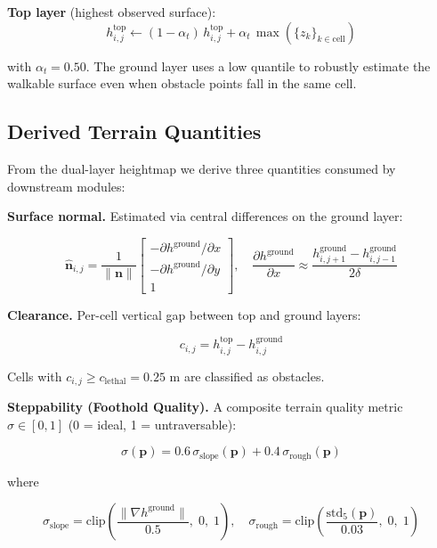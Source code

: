 \documentclass[11pt,a4paper]{article}
\begin{document}
\textbf{Top layer} (highest observed surface):
\begin{equation}
h^{\text{top}}_{i,j} \leftarrow (1 - \alpha_t)\, h^{\text{top}}_{i,j} + \alpha_t\, \max(\{z_k\}_{k \in \text{cell}})
\end{equation}

with $\alpha_t = 0.50$. The ground layer uses a low quantile to robustly estimate the walkable surface even when obstacle points fall in the same cell.

\subsection{Derived Terrain Quantities}

From the dual-layer heightmap we derive three quantities consumed by downstream modules:

\textbf{Surface normal.} Estimated via central differences on the ground layer:

\begin{equation}
\hat{\mathbf{n}}_{i,j} = \frac{1}{\|\mathbf{n}\|}\begin{bmatrix} -\partial h^{\text{ground}} / \partial x \\ -\partial h^{\text{ground}} / \partial y \\ 1 \end{bmatrix}, \quad \frac{\partial h^{\text{ground}}}{\partial x} \approx \frac{h^{\text{ground}}_{i,j+1} - h^{\text{ground}}_{i,j-1}}{2\delta}
\end{equation}

\textbf{Clearance.} Per-cell vertical gap between top and ground layers:

\begin{equation}
c_{i,j} = h^{\text{top}}_{i,j} - h^{\text{ground}}_{i,j}
\end{equation}

Cells with $c_{i,j} \geq c_{\text{lethal}} = 0.25$ m are classified as obstacles.

\textbf{Steppability (Foothold Quality).} A composite terrain quality metric $\sigma \in [0, 1]$ (0 = ideal, 1 = untraversable):

\begin{equation}
\sigma(\mathbf{p}) = 0.6\, \sigma_{\text{slope}}(\mathbf{p}) + 0.4\, \sigma_{\text{rough}}(\mathbf{p})
\end{equation}

where

\begin{equation}
\sigma_{\text{slope}} = \text{clip}\!\left(\frac{\|\nabla h^{\text{ground}}\|}{0.5},\; 0,\; 1\right), \quad \sigma_{\text{rough}} = \text{clip}\!\left(\frac{\text{std}_5(\mathbf{p})}{0.03},\; 0,\; 1\right)
\end{equation}
\end{document}
